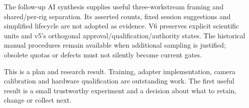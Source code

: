 \documentclass[11pt,a4paper]{article}
\begin{document}
The follow-up AI synthesis supplies useful three-workstream framing and
shared/per-rig separation. Its asserted counts, fixed session suggestions and
simplified lifecycle are not adopted as evidence. V6 preserves explicit
scientific units and v5's orthogonal approval/qualification/authority states.
The historical manual procedures remain available when additional sampling is
justified; obsolete quotas or defects must not silently become current gates.

This is a plan and research result. Training, adapter implementation, camera
calibration and hardware qualification are outstanding work. The first useful
result is a small trustworthy experiment and a decision about what to retain,
change or collect next.
\end{document}
